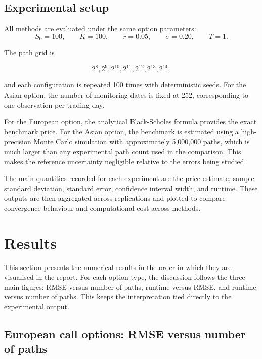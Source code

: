 \documentclass[11pt]{article}
\begin{document}
\subsection{Experimental setup}

All methods are evaluated under the same option parameters:
\begin{equation}
S_0 = 100,\qquad K = 100,\qquad r = 0.05,\qquad \sigma = 0.20,\qquad T = 1.
\end{equation}

The path grid is

\begin{equation}
2^8, 2^9, 2^{10}, 2^{11}, 2^{12}, 2^{13}, 2^{14},
\end{equation}

and each configuration is repeated 100 times with deterministic seeds. For the Asian option, the number of monitoring dates is fixed at 252, corresponding to one observation per trading day.

For the European option, the analytical Black-Scholes formula provides the exact benchmark price. For the Asian option, the benchmark is estimated using a high-precision Monte Carlo simulation with approximately 5,000,000 paths, which is much larger than any experimental path count used in the comparison. This makes the reference uncertainty negligible relative to the errors being studied.

The main quantities recorded for each experiment are the price estimate, sample standard deviation, standard error, confidence interval width, and runtime. These outputs are then aggregated across replications and plotted to compare convergence behaviour and computational cost across methods.


\section{Results}

This section presents the numerical results in the order in which they are visualised in the report. For each option type, the discussion follows the three main figures: RMSE versus number of paths, runtime versus RMSE, and runtime versus number of paths. This keeps the interpretation tied directly to the experimental output.

\subsection{European call options: RMSE versus number of paths}
\end{document}

